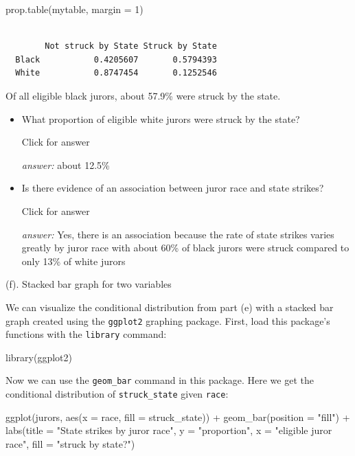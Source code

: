 \documentclass[
]{book}
\newenvironment{Shaded}{\begin{snugshade}}{\end{snugshade}}
\newcommand{\AttributeTok}[1]{\textcolor[rgb]{0.77,0.63,0.00}{#1}}
\newcommand{\DecValTok}[1]{\textcolor[rgb]{0.00,0.00,0.81}{#1}}
\newcommand{\FunctionTok}[1]{\textcolor[rgb]{0.00,0.00,0.00}{#1}}
\newcommand{\NormalTok}[1]{#1}
\newcommand{\SpecialCharTok}[1]{\textcolor[rgb]{0.00,0.00,0.00}{#1}}
\newcommand{\StringTok}[1]{\textcolor[rgb]{0.31,0.60,0.02}{#1}}
\providecommand{\tightlist}{%
  \setlength{\itemsep}{0pt}\setlength{\parskip}{0pt}}
\begin{document}
\begin{Shaded}
\begin{Highlighting}[]
\FunctionTok{prop.table}\NormalTok{(mytable, }\AttributeTok{margin =} \DecValTok{1}\NormalTok{)}
\end{Highlighting}
\end{Shaded}

\begin{verbatim}
       
        Not struck by State Struck by State
  Black           0.4205607       0.5794393
  White           0.8747454       0.1252546
\end{verbatim}

Of all eligible black jurors, about 57.9\% were struck by the state.

\begin{itemize}
\tightlist
\item
  What proportion of eligible white jurors were struck by the state?

  Click for answer

  \emph{answer:} about 12.5\%
\item
  Is there evidence of an association between juror race and state strikes?

  Click for answer

  \emph{answer:} Yes, there is an association because the rate of state strikes varies greatly by juror race with
  about 60\% of black jurors were struck compared to only 13\% of white jurors
\end{itemize}

(f). Stacked bar graph for two variables

We can visualize the conditional distribution from part (e) with a stacked bar graph created using the \texttt{ggplot2} graphing package. First, load this package's functions with the \texttt{library} command:

\begin{Shaded}
\begin{Highlighting}[]
\FunctionTok{library}\NormalTok{(ggplot2)}
\end{Highlighting}
\end{Shaded}

Now we can use the \texttt{geom\_bar} command in this package. Here we get the conditional distribution of \texttt{struck\_state} given \texttt{race}:

\begin{Shaded}
\begin{Highlighting}[]
\FunctionTok{ggplot}\NormalTok{(jurors, }\FunctionTok{aes}\NormalTok{(}\AttributeTok{x =}\NormalTok{ race, }\AttributeTok{fill =}\NormalTok{ struck\_state)) }\SpecialCharTok{+} 
  \FunctionTok{geom\_bar}\NormalTok{(}\AttributeTok{position =} \StringTok{"fill"}\NormalTok{) }\SpecialCharTok{+} 
  \FunctionTok{labs}\NormalTok{(}\AttributeTok{title =} \StringTok{"State strikes by juror race"}\NormalTok{, }\AttributeTok{y =} \StringTok{"proportion"}\NormalTok{, }
       \AttributeTok{x =} \StringTok{"eligible juror race"}\NormalTok{, }\AttributeTok{fill =} \StringTok{"struck by state?"}\NormalTok{)}
\end{Highlighting}
\end{Shaded}
\end{document}
